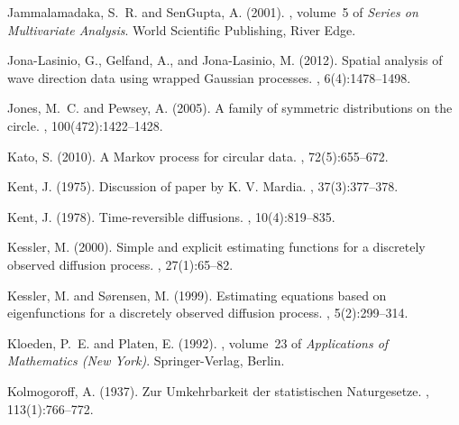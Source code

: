 \documentclass[oneside,11pt]{article}
\begin{document}
\begin{thebibliography}{}
	Jammalamadaka, S.~R. and SenGupta, A. (2001).
	, volume~5 of {\em Series on
		Multivariate Analysis}.
	\newblock World Scientific Publishing, River Edge.
	
	Jona-Lasinio, G., Gelfand, A., and Jona-Lasinio, M. (2012).
	\newblock Spatial analysis of wave direction data using wrapped {G}aussian
	processes.
	, 6(4):1478--1498.
	
	Jones, M.~C. and Pewsey, A. (2005).
	\newblock A family of symmetric distributions on the circle.
	, 100(472):1422--1428.
	
	Kato, S. (2010).
	\newblock A {M}arkov process for circular data.
	, 72(5):655--672.
	
	Kent, J. (1975).
	\newblock Discussion of paper by {K}. {V}. {M}ardia.
	, 37(3):377--378.
	
	Kent, J. (1978).
	\newblock Time-reversible diffusions.
	, 10(4):819--835.
	
	Kessler, M. (2000).
	\newblock Simple and explicit estimating functions for a discretely observed
	diffusion process.
	, 27(1):65--82.
	
	Kessler, M. and S{\o}rensen, M. (1999).
	\newblock Estimating equations based on eigenfunctions for a discretely
	observed diffusion process.
	, 5(2):299--314.
	
	Kloeden, P.~E. and Platen, E. (1992).
	,
	volume~23 of {\em Applications of Mathematics (New York)}.
	\newblock Springer-Verlag, Berlin.
	
	Kolmogoroff, A. (1937).
	\newblock Zur {U}mkehrbarkeit der statistischen {N}aturgesetze.
	, 113(1):766--772.
	

\end{thebibliography}
\end{document}
